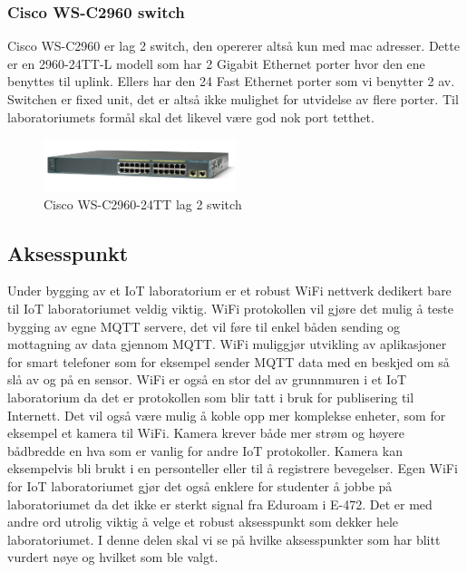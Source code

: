 \documentclass{article}
\begin{document}
\subsubsection{Cisco WS-C2960 switch}
Cisco WS-C2960 er lag 2 switch, den opererer altså kun med mac adresser. Dette er en 2960-24TT-L modell som har 2 Gigabit Ethernet porter hvor den ene benyttes til uplink. Ellers har den 24 Fast Ethernet porter som vi benytter 2 av. Switchen er fixed unit, det er altså ikke mulighet for utvidelse av flere porter. Til laboratoriumets formål skal det likevel være god nok port tetthet. %

\begin{figure}[!ht]
  \centering
      \includegraphics[width=0.5\textwidth]{C2960}
  \caption {Cisco WS-C2960-24TT lag 2 switch}
\end{figure}

\subsection{Aksesspunkt}
Under bygging av et IoT laboratorium er et robust WiFi nettverk dedikert bare til IoT laboratoriumet veldig viktig. WiFi protokollen vil gjøre det mulig å teste bygging av egne MQTT servere, det vil føre til enkel båden sending og mottagning av data gjennom MQTT. WiFi muliggjør utvikling av aplikasjoner for smart telefoner som for eksempel sender MQTT data med en beskjed om så slå av og på en sensor. WiFi er også en stor del av grunnmuren i et IoT laboratorium da det er protokollen som blir tatt i bruk for publisering til Internett. Det vil også være mulig å koble opp mer komplekse enheter, som for eksempel et kamera  til WiFi. Kamera krever både mer strøm og høyere bådbredde en hva som er vanlig for andre IoT protokoller. Kamera kan eksempelvis bli brukt i en personteller eller til å registrere bevegelser.  Egen WiFi for IoT laboratoriumet gjør det også enklere for studenter å jobbe på laboratoriumet da det ikke er sterkt signal fra Eduroam i E-472. Det er med andre ord utrolig viktig å velge et robust aksesspunkt som dekker hele laboratoriumet. I denne delen skal vi se på hvilke aksesspunkter som har blitt vurdert nøye og hvilket som ble valgt.
\end{document}
